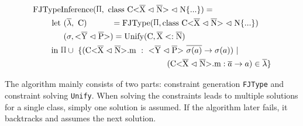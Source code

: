 \begin{align*}
    \text{FJType}&\text{Inference}(\sprod{0.7}, \ \classheader \{ ... \}) = \\
    \text{let} & \ (\overline{\lambda}, \ \text{C}) \quad \quad \quad = \text{FJType}(\sprod{0.7}, \classheader \{ ... \}) \\
    & \ (\sigma, \yp) = \text{Unify}(\text{C}, \overline{\text{X}} <: \overline{\text{N}}) \\
    \text{in} \ & \sprod{0.7} \cup \ \{( \cm \ : \ \yp \ \oto{\sigma(a)}) \ | \\
    & \quad \quad \quad \quad \quad \quad \quad \quad \quad \quad \quad \quad \quad (\cm : \oto{a} ) \in \overline{\lambda} \}
\end{align*}

The algorithm mainly consists of two parts: constraint generation \verb|FJType| and constraint solving \verb|Unify|.
When solving the constraints leads to multiple solutions for a single class, simply one solution is assumed. If the algorithm later fails, it backtracks and assumes the next solution.
